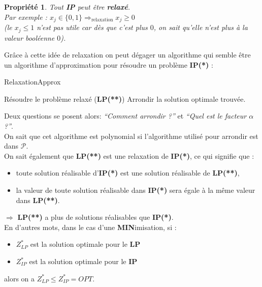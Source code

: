 \documentclass[12pt]{article}
\newcommand{\titre}[1]{\textcolor{title}{#1}}
\newtheorem{propriete}{Propri\'et\'e}[section]
\begin{document}
\begin{propriete}
Tout \textbf{\titre{IP}} peut être \textbf{relaxé}. \\
Par exemple : \(x_j \in \{0,1\} \Rightarrow_{\text{relaxation}} x_j \geq 0\)\\
(le $x_j \leq 1$ n'est pas utile car dès que c'est plus $0$, on sait qu'elle
n'est plus à la valeur booléenne $0$).
\end{propriete}

Grâce à cette idée de relaxation on peut dégager un algorithme qui semble être
un algorithme d'approximation pour résoudre un problème \textbf{IP(*)} :
\begin{algorithm}[H]
\caption{RelaxationApprox}
\begin{algorithmic}[1]
\STATE Résoudre le problème relaxé (\textbf{LP(**)})
\STATE Arrondir la solution optimale trouvée.
\end{algorithmic}
\end{algorithm}

Deux questions se posent alors: \textit{``Comment arrondir ?''} et
\textit{``Quel est le facteur $\alpha$ ?''}.\\
On sait que cet algorithme est polynomial si l'algorithme utilisé pour arrondir
est dans $\mathcal{P}$. \\
On sait également que \textbf{LP(**)} est une relaxation de \textbf{IP(*)}, ce
qui signifie que :
\begin{itemize}
\item toute solution réalisable d'\textbf{IP(*)} est une solution réalisable de
\textbf{LP(**)},
\item la valeur de toute solution réalisable dans \textbf{IP(*)} sera égale à la
même valeur dans \textbf{LP(**)}.
\end{itemize}
$\Rightarrow$ \textbf{LP(**)} a plus de solutions réalisables que
\textbf{IP(*)}.\\
En d'autres mots, dans le cas d'une \textbf{MIN}imisation, si :
\begin{itemize}
\item $Z^*_{LP}$ est la solution optimale pour le \textbf{LP}
\item $Z^*_{IP}$ est la solution optimale pour le \textbf{IP}
\end{itemize}
alors on a $\boxed{Z^*_{LP} \leq Z^*_{IP} = OPT}$. \\
\end{document}
